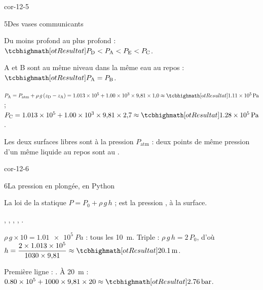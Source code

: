 \begin{blocLivre}{cor-12-5}
\begin{corrige}{5}{Des vases communicants}
\begin{questions}
\item Du moins profond au plus profond : $\res{P_\mathrm{D}<P_\mathrm{A}<P_\mathrm{E}<P_\mathrm{C}}$.
\item A et B sont au même niveau dans la même eau au repos : $\res{P_\mathrm{A}=P_\mathrm{B}}$.
\item $P_\mathrm{A}=P_\mathrm{atm}+\rho\,g\,(z_\mathrm{D}-z_\mathrm{A})=\num{1,013e5}+\num{1,00e3}\times9{,}81\times1{,}0\approx\res{\qty{1,11e5}{Pa}}$ ;
$P_\mathrm{C}=\num{1,013e5}+\num{1,00e3}\times9{,}81\times2{,}7\approx\res{\qty{1,28e5}{Pa}}$.
\item Les deux surfaces libres sont à la pression $P_\mathrm{atm}$ : deux points de même pression d'un même liquide au repos sont
au .
\end{questions}
\end{corrige}
\end{blocLivre}
\begin{blocLivre}{cor-12-6}
\begin{corrige}{6}{La pression en plongée, en Python}
\begin{questions}
\item La loi de la statique $P=P_0+\rho\,g\,h$ ;  est la pression , à la surface.
\item {}, , , , .
\item $\rho\,g\times10=\qty{1,01e5}{Pa}$ :  tous les \qty{10}{m}. Triple : $\rho\,g\,h=2\,P_0$, d'où $h=\dfrac{2\times\num{1,013e5}}{1030\times9{,}81}\approx\res{\qty{20,1}{m}}$.
\item Première ligne : . À \qty{20}{m} : $\num{0,80e5}+1000\times9{,}81\times20\approx\res{\qty{2,76}{bar}}$.
\end{questions}
\end{corrige}
\end{blocLivre}
